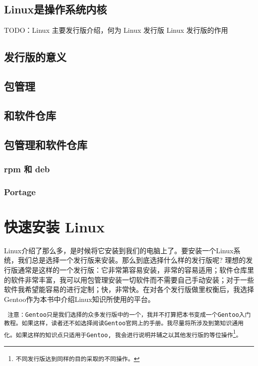 \documentclass[amstex,twoside]{ctexbook}
\newenvironment{notice}{\tt}{}
\begin{document}
\section{Linux是操作系统内核}

TODO：Linux 主要发行版介绍，何为 Linux 发行版 Linux 发行版的作用

\section{发行版的意义}
\section{包管理}
\section{和软件仓库}


\section{包管理和软件仓库}

\subsection*{rpm 和 deb}
\subsection*{Portage}


\chapter{快速安装 Linux}
Linux介绍了那么多，是时候将它安装到我们的电脑上了。要安装一个Linux系统，我们总是选择一个发行版来安装。那么到底选择什么样的发行版呢? 理想的发行版通常是这样的一个发行版：它非常第容易安装，非常的容易适用；软件仓库里的软件非常丰富，我可以用包管理安装一切软件而不需要自己手动安装；对于一些软件我希望能容易的进行定制；快，非常快。在对各个发行版做里权衡后，我选择Gentoo作为本书中介绍Linux知识所使用的平台。


\begin{notice}
 注意：Gentoo只是我们选择的众多发行版中的一个，我并不打算把本书变成一个Gentoo入门教程。如果这样，读者还不如选择阅读Gentoo官网上的手册。我尽量将所涉及到第知识通用化。如果这样的知识点只适用于Gentoo, 我会进行说明并辅之以其他发行版的等位操作\footnote{不同发行版达到同样的目的采取的不同操作。}。
\end{notice}
\end{document}

